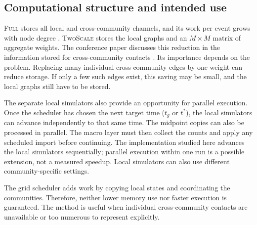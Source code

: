\documentclass[a4paper,fleqn]{cas-sc}
\newcommand{\Full}{\textup{\textsc{Full}}}
\newcommand{\TS}{\textup{\textsc{TwoScale}}}
\begin{document}
\subsection{Computational structure and intended use}
\label{sec:cost}

\Full{} stores all local and cross-community channels, and its work per event grows with node degree \citep{kuryliak2025simulating}. \TS{} stores the local graphs and an $M\times M$ matrix of aggregate weights. The conference paper discusses this reduction in the information stored for cross-community contacts \citep{kuryliak2025towards}. Its importance depends on the problem. Replacing many individual cross-community edges by one weight can reduce storage. If only a few such edges exist, this saving may be small, and the local graphs still have to be stored.

The separate local simulators also provide an opportunity for parallel execution. Once the scheduler has chosen the next target time ($t_g$ or $t^\ast$), the local simulators can advance independently to that same time. The midpoint copies can also be processed in parallel. The macro layer must then collect the counts and apply any scheduled import before continuing. The implementation studied here advances the local simulators sequentially; parallel execution within one run is a possible extension, not a measured speedup. Local simulators can also use different community-specific settings.

The grid scheduler adds work by copying local states and coordinating the communities. Therefore, neither lower memory use nor faster execution is guaranteed. The method is useful when individual cross-community contacts are unavailable or too numerous to represent explicitly.

\clearpage
\endgroup



\end{document}
